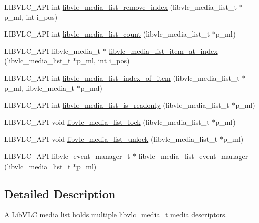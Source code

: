 \begin{DoxyCompactItemize}
\item 
L\+I\+B\+V\+L\+C\+\_\+\+A\+PI int \hyperlink{group__libvlc__media__list_ga19bdb775f747bd6aaf31b542e600bb87}{libvlc\+\_\+media\+\_\+list\+\_\+remove\+\_\+index} (libvlc\+\_\+media\+\_\+list\+\_\+t $\ast$p\+\_\+ml, int i\+\_\+pos)
\item 
L\+I\+B\+V\+L\+C\+\_\+\+A\+PI int \hyperlink{group__libvlc__media__list_ga91adfaf535ae4a6338a53865f45444d7}{libvlc\+\_\+media\+\_\+list\+\_\+count} (libvlc\+\_\+media\+\_\+list\+\_\+t $\ast$p\+\_\+ml)
\item 
L\+I\+B\+V\+L\+C\+\_\+\+A\+PI libvlc\+\_\+media\+\_\+t $\ast$ \hyperlink{group__libvlc__media__list_ga92305e7bffe1c30ba6f0f2ebf7ad3c9e}{libvlc\+\_\+media\+\_\+list\+\_\+item\+\_\+at\+\_\+index} (libvlc\+\_\+media\+\_\+list\+\_\+t $\ast$p\+\_\+ml, int i\+\_\+pos)
\item 
L\+I\+B\+V\+L\+C\+\_\+\+A\+PI int \hyperlink{group__libvlc__media__list_ga7ba4219836788ca58127199da06a6550}{libvlc\+\_\+media\+\_\+list\+\_\+index\+\_\+of\+\_\+item} (libvlc\+\_\+media\+\_\+list\+\_\+t $\ast$p\+\_\+ml, libvlc\+\_\+media\+\_\+t $\ast$p\+\_\+md)
\item 
L\+I\+B\+V\+L\+C\+\_\+\+A\+PI int \hyperlink{group__libvlc__media__list_ga93b9fc524ba86c1fd3151a49f6486f54}{libvlc\+\_\+media\+\_\+list\+\_\+is\+\_\+readonly} (libvlc\+\_\+media\+\_\+list\+\_\+t $\ast$p\+\_\+ml)
\item 
L\+I\+B\+V\+L\+C\+\_\+\+A\+PI void \hyperlink{group__libvlc__media__list_ga908ca009b4ebecbccdeb5650c72cd7a9}{libvlc\+\_\+media\+\_\+list\+\_\+lock} (libvlc\+\_\+media\+\_\+list\+\_\+t $\ast$p\+\_\+ml)
\item 
L\+I\+B\+V\+L\+C\+\_\+\+A\+PI void \hyperlink{group__libvlc__media__list_gaa91574447f7b7baa18e4054cf1957c51}{libvlc\+\_\+media\+\_\+list\+\_\+unlock} (libvlc\+\_\+media\+\_\+list\+\_\+t $\ast$p\+\_\+ml)
\item 
L\+I\+B\+V\+L\+C\+\_\+\+A\+PI \hyperlink{group__libvlc__event_gaa82f247503d3558b9117550e8d3c9259}{libvlc\+\_\+event\+\_\+manager\+\_\+t} $\ast$ \hyperlink{group__libvlc__media__list_gae2623249eb6571b5b007ddc74497bba6}{libvlc\+\_\+media\+\_\+list\+\_\+event\+\_\+manager} (libvlc\+\_\+media\+\_\+list\+\_\+t $\ast$p\+\_\+ml)
\end{DoxyCompactItemize}


\subsection{Detailed Description}
A Lib\+V\+LC media list holds multiple libvlc\+\_\+media\+\_\+t media descriptors. 

